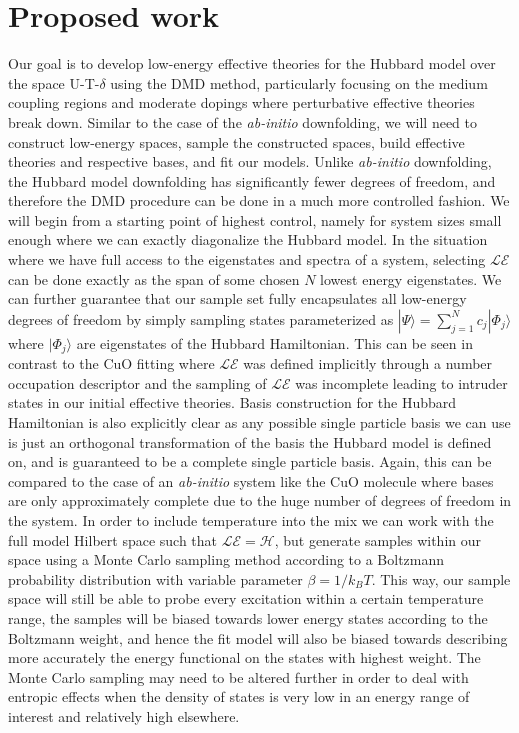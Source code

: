 \documentclass{article}
\begin{document}
\section{Proposed work}
Our goal is to develop low-energy effective theories for the
Hubbard model over the space U-T-$\delta$ using the DMD method, particularly focusing on the medium coupling regions and moderate dopings where perturbative effective theories break down.
Similar to the case of the \textit{ab-initio} downfolding, we will need to construct low-energy spaces, sample the constructed spaces, build effective theories and respective bases, and fit our models.
Unlike \textit{ab-initio} downfolding, the Hubbard model downfolding has significantly fewer degrees of freedom, and therefore the DMD procedure can be done in a much more controlled fashion.
We will begin from a starting point of highest control, namely for system sizes small enough where we can exactly diagonalize the Hubbard model.
In the situation where we have full access to the eigenstates and spectra of a system, selecting $\mathcal{LE}$ can be done exactly as the span of some chosen $N$ lowest energy eigenstates. 
We can further guarantee that our sample set fully encapsulates all low-energy degrees of freedom by simply sampling states parameterized as $|\Psi\rangle = \sum_{j=1}^N c_j |\Phi_j\rangle$ where $|\Phi_j\rangle$ are eigenstates of the Hubbard Hamiltonian.
This can be seen in contrast to the CuO fitting where $\mathcal{LE}$ was defined implicitly through a number occupation descriptor and the sampling of $\mathcal{LE}$ was incomplete leading to intruder states in our initial effective theories.
Basis construction for the Hubbard Hamiltonian is also explicitly clear as any possible single particle basis we can use is just an orthogonal transformation of the basis the Hubbard model is defined on, and is guaranteed to be a complete single particle basis.
Again, this can be compared to the case of an \textit{ab-initio} system like the CuO molecule where bases are only approximately complete due to the huge number of degrees of freedom in the system.
In order to include temperature into the mix we can work with the full model Hilbert space such that $\mathcal{LE} = \mathcal{H}$, but generate samples within our space using a Monte Carlo sampling method according to a Boltzmann probability distribution with variable parameter $\beta = 1/k_BT$.
This way, our sample space will still be able to probe every excitation within a certain temperature range, the samples will be biased towards lower energy states according to the Boltzmann weight, and hence the fit model will also be biased towards describing more accurately the energy functional on the states with highest weight.
The Monte Carlo sampling may need to be altered further in order to deal with entropic effects when the density of states is very low in an energy range of interest and relatively high elsewhere. 
\end{document}
